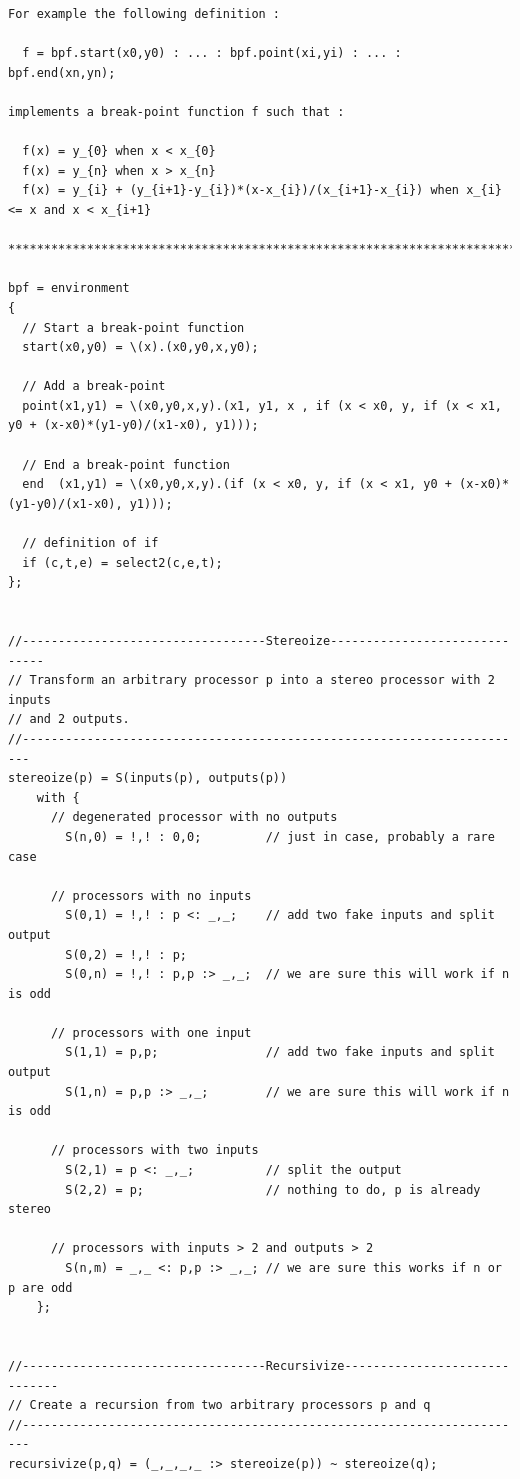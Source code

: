 \documentclass{article}
\begin{document}
\begin{lstlisting}[caption=\texttt{music.lib}]
For example the following definition :

  f = bpf.start(x0,y0) : ... : bpf.point(xi,yi) : ... : bpf.end(xn,yn);

implements a break-point function f such that :

  f(x) = y_{0} when x < x_{0}
  f(x) = y_{n} when x > x_{n}
  f(x) = y_{i} + (y_{i+1}-y_{i})*(x-x_{i})/(x_{i+1}-x_{i}) when x_{i} <= x and x < x_{i+1} 

******************************************************************************/

bpf = environment 
{
  // Start a break-point function
  start(x0,y0) = \(x).(x0,y0,x,y0);

  // Add a break-point
  point(x1,y1) = \(x0,y0,x,y).(x1, y1, x , if (x < x0, y, if (x < x1, y0 + (x-x0)*(y1-y0)/(x1-x0), y1)));

  // End a break-point function
  end  (x1,y1) = \(x0,y0,x,y).(if (x < x0, y, if (x < x1, y0 + (x-x0)*(y1-y0)/(x1-x0), y1)));

  // definition of if
  if (c,t,e) = select2(c,e,t);
};


//----------------------------------Stereoize------------------------------
// Transform an arbitrary processor p into a stereo processor with 2 inputs
// and 2 outputs.
//-----------------------------------------------------------------------
stereoize(p) = S(inputs(p), outputs(p))
	with {
	  // degenerated processor with no outputs
		S(n,0) = !,! : 0,0; 		// just in case, probably a rare case

	  // processors with no inputs
		S(0,1) = !,! : p <: _,_; 	// add two fake inputs and split output
		S(0,2) = !,! : p;
		S(0,n) = !,! : p,p :> _,_;	// we are sure this will work if n is odd
 
	  // processors with one input
		S(1,1) = p,p; 				// add two fake inputs and split output
		S(1,n) = p,p :> _,_;		// we are sure this will work if n is odd
 
	  // processors with two inputs
		S(2,1) = p <: _,_; 			// split the output
		S(2,2) = p; 				// nothing to do, p is already stereo
 
	  // processors with inputs > 2 and outputs > 2
		S(n,m) = _,_ <: p,p :> _,_;	// we are sure this works if n or p are odd
	};


//----------------------------------Recursivize------------------------------
// Create a recursion from two arbitrary processors p and q 
//-----------------------------------------------------------------------
recursivize(p,q) = (_,_,_,_ :> stereoize(p)) ~ stereoize(q);



\end{lstlisting}
\end{document}
